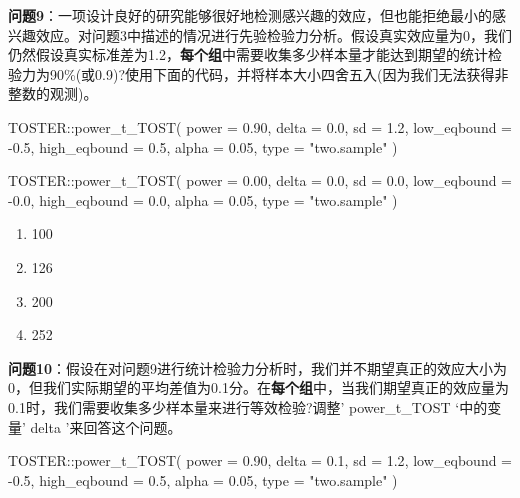 \documentclass[
  letterpaper,
  DIV=11,
  numbers=noendperiod]{scrreprt}
\newenvironment{Shaded}{\begin{snugshade}}{\end{snugshade}}
\newcommand{\AttributeTok}[1]{\textcolor[rgb]{0.40,0.45,0.13}{#1}}
\newcommand{\FloatTok}[1]{\textcolor[rgb]{0.68,0.00,0.00}{#1}}
\newcommand{\FunctionTok}[1]{\textcolor[rgb]{0.28,0.35,0.67}{#1}}
\newcommand{\NormalTok}[1]{\textcolor[rgb]{0.00,0.23,0.31}{#1}}
\newcommand{\SpecialCharTok}[1]{\textcolor[rgb]{0.37,0.37,0.37}{#1}}
\newcommand{\StringTok}[1]{\textcolor[rgb]{0.13,0.47,0.30}{#1}}
\providecommand{\tightlist}{%
  \setlength{\itemsep}{0pt}\setlength{\parskip}{0pt}}\usepackage{longtable,booktabs,array}
\begin{document}
\textbf{问题9}：一项设计良好的研究能够很好地检测感兴趣的效应，但也能拒绝最小的感兴趣效应。对问题3中描述的情况进行先验检验力分析。假设真实效应量为0，我们仍然假设真实标准差为1.2，\textbf{每个组}中需要收集多少样本量才能达到期望的统计检验力为90\%(或0.9)?使用下面的代码，并将样本大小四舍五入(因为我们无法获得非整数的观测)。

\begin{Shaded}
\begin{Highlighting}[]
\NormalTok{TOSTER}\SpecialCharTok{::}\FunctionTok{power\_t\_TOST}\NormalTok{(}
  \AttributeTok{power =} \FloatTok{0.90}\NormalTok{,}
  \AttributeTok{delta =} \FloatTok{0.0}\NormalTok{,}
  \AttributeTok{sd =} \FloatTok{1.2}\NormalTok{,}
  \AttributeTok{low\_eqbound =} \SpecialCharTok{{-}}\FloatTok{0.5}\NormalTok{,}
  \AttributeTok{high\_eqbound =} \FloatTok{0.5}\NormalTok{,}
  \AttributeTok{alpha =} \FloatTok{0.05}\NormalTok{,}
  \AttributeTok{type =} \StringTok{"two.sample"}
\NormalTok{)}
\end{Highlighting}
\end{Shaded}

\begin{Shaded}
\begin{Highlighting}[]
\NormalTok{TOSTER}\SpecialCharTok{::}\FunctionTok{power\_t\_TOST}\NormalTok{(}
  \AttributeTok{power =} \FloatTok{0.00}\NormalTok{,}
  \AttributeTok{delta =} \FloatTok{0.0}\NormalTok{,}
  \AttributeTok{sd =} \FloatTok{0.0}\NormalTok{,}
  \AttributeTok{low\_eqbound =} \SpecialCharTok{{-}}\FloatTok{0.0}\NormalTok{,}
  \AttributeTok{high\_eqbound =} \FloatTok{0.0}\NormalTok{,}
  \AttributeTok{alpha =} \FloatTok{0.05}\NormalTok{,}
  \AttributeTok{type =} \StringTok{"two.sample"}
\NormalTok{)}
\end{Highlighting}
\end{Shaded}

\begin{enumerate}
\def\labelenumi{\Alph{enumi})}
\tightlist
\item
  100
\item
  126
\item
  200
\item
  252
\end{enumerate}

\textbf{问题10}：假设在对问题9进行统计检验力分析时，我们并不期望真正的效应大小为0，但我们实际期望的平均差值为0.1分。在\textbf{每个组}中，当我们期望真正的效应量为0.1时，我们需要收集多少样本量来进行等效检验?调整'
power\_t\_TOST `中的变量' delta '来回答这个问题。

\begin{Shaded}
\begin{Highlighting}[]
\NormalTok{TOSTER}\SpecialCharTok{::}\FunctionTok{power\_t\_TOST}\NormalTok{(}
  \AttributeTok{power =} \FloatTok{0.90}\NormalTok{,}
  \AttributeTok{delta =} \FloatTok{0.1}\NormalTok{,}
  \AttributeTok{sd =} \FloatTok{1.2}\NormalTok{,}
  \AttributeTok{low\_eqbound =} \SpecialCharTok{{-}}\FloatTok{0.5}\NormalTok{,}
  \AttributeTok{high\_eqbound =} \FloatTok{0.5}\NormalTok{,}
  \AttributeTok{alpha =} \FloatTok{0.05}\NormalTok{,}
  \AttributeTok{type =} \StringTok{"two.sample"}
\NormalTok{)}
\end{Highlighting}
\end{Shaded}
\end{document}
